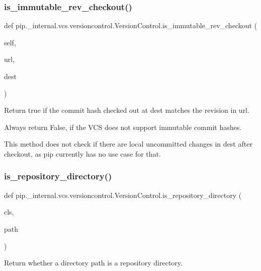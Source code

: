 \subsubsection{\texorpdfstring{is\+\_\+immutable\+\_\+rev\+\_\+checkout()}{is\_immutable\_rev\_checkout()}}
{\footnotesize\ttfamily def pip.\+\_\+internal.\+vcs.\+versioncontrol.\+Version\+Control.\+is\+\_\+immutable\+\_\+rev\+\_\+checkout (\begin{DoxyParamCaption}\item[{}]{self,  }\item[{}]{url,  }\item[{}]{dest }\end{DoxyParamCaption})}

\begin{DoxyVerb}Return true if the commit hash checked out at dest matches
the revision in url.

Always return False, if the VCS does not support immutable commit
hashes.

This method does not check if there are local uncommitted changes
in dest after checkout, as pip currently has no use case for that.
\end{DoxyVerb}
 \mbox{\label{classpip_1_1__internal_1_1vcs_1_1versioncontrol_1_1VersionControl_a90b73a5f179be0defd7bb75abdf38ad2}} 
\subsubsection{\texorpdfstring{is\+\_\+repository\+\_\+directory()}{is\_repository\_directory()}}
{\footnotesize\ttfamily def pip.\+\_\+internal.\+vcs.\+versioncontrol.\+Version\+Control.\+is\+\_\+repository\+\_\+directory (\begin{DoxyParamCaption}\item[{}]{cls,  }\item[{}]{path }\end{DoxyParamCaption})}

\begin{DoxyVerb}Return whether a directory path is a repository directory.
\end{DoxyVerb}
 \mbox{\label{classpip_1_1__internal_1_1vcs_1_1versioncontrol_1_1VersionControl_aaa527596c67661e61f407396615688d5}} 
